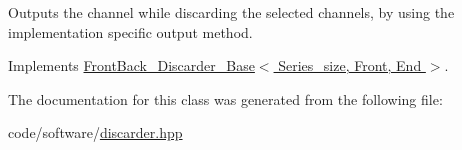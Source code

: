 Outputs the channel while discarding the selected channels, by using the implementation specific output method. 



Implements \hyperlink{classFrontBack__Discarder__Base_ab8a1d0082f223c31da3c1374c520c4c4}{Front\+Back\+\_\+\+Discarder\+\_\+\+Base$<$ Series\+\_\+size, Front, End $>$}.



The documentation for this class was generated from the following file\+:\begin{DoxyCompactItemize}
\item 
code/software/\hyperlink{discarder_8hpp}{discarder.\+hpp}\end{DoxyCompactItemize}
